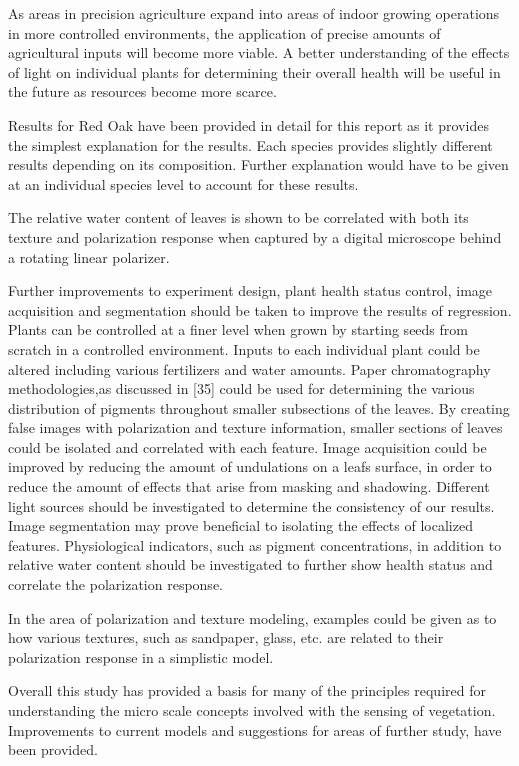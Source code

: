 As areas in precision agriculture expand into areas of indoor growing operations in more controlled environments, the application of precise amounts of agricultural inputs will become more viable.  A better understanding of the effects of light on individual plants for determining their overall health will be useful in the future as resources become more scarce.

Results for Red Oak have been provided in detail for this report as it provides the simplest explanation for the results.  Each species provides slightly different results depending on its composition.  Further explanation would have to be given at an individual species level to account for these results.

The relative water content of leaves is shown to be correlated with both its texture and polarization response when captured by a digital microscope behind a rotating linear polarizer.

Further improvements to experiment design, plant health status control, image acquisition and segmentation should be taken to improve the results of regression.  Plants can be controlled at a finer level when grown by starting seeds from scratch in a controlled environment.  Inputs to each individual plant could be altered including various fertilizers and water amounts.  Paper chromatography methodologies,as discussed in [35] could be used for determining the various distribution of pigments throughout smaller subsections of the leaves.  By creating false images with polarization and texture information, smaller sections of leaves could be isolated and correlated with each feature.  Image acquisition could be improved by reducing the amount of undulations on a leafs surface, in order to reduce the amount of effects that arise from masking and shadowing.  Different light sources should be investigated to determine the consistency of our results.  Image segmentation may prove beneficial to isolating the effects of localized features.  Physiological indicators, such as pigment concentrations, in addition to relative water content should be investigated to further show health status and correlate the polarization response.

In the area of polarization and texture modeling, examples could be given as to how various textures, such as sandpaper, glass, etc. are related to their polarization response in a simplistic model.

Overall this study has provided a basis for many of the principles required for understanding the micro scale concepts involved with the sensing of vegetation. Improvements to current models and suggestions for areas of further study, have been provided.
